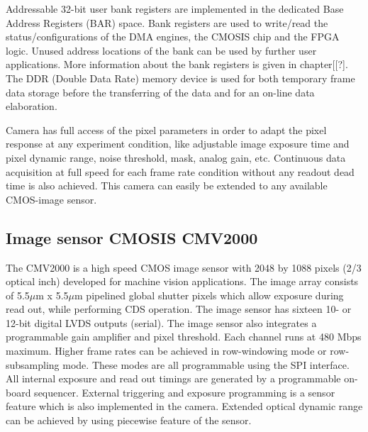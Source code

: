 Addressable 32-bit user bank registers are implemented in the dedicated Base Address Registers (BAR) space. Bank registers are used to write/read the status/configurations of the DMA engines, the CMOSIS chip and the FPGA logic. Unused address locations of the bank can be used by further user applications. More information about the bank registers is given in chapter[[?]. The DDR (Double Data Rate) memory device is used for both temporary frame data storage before the transferring of the data and for an on-line data elaboration.

Camera has full access of the pixel parameters in order to adapt the pixel response at any experiment condition, like adjustable image exposure time and pixel dynamic range, noise threshold, mask, analog gain, etc. Continuous data acquisition at full speed for each frame rate condition without any readout dead time is also achieved. This camera can easily be extended to any available CMOS-image sensor.


\subsection{Image sensor CMOSIS CMV2000}

The CMV2000 is a high speed CMOS image sensor with 2048 by 1088 pixels (2/3 optical inch) developed for machine vision applications. The image array consists of 5.5$\mu$m x 5.5$\mu$m pipelined global shutter pixels which allow exposure during read out, while performing CDS operation. The image sensor has sixteen 10- or 12-bit digital LVDS outputs (serial). The image sensor also integrates a programmable gain amplifier and pixel threshold. Each channel runs at 480 Mbps maximum. Higher frame rates can be achieved in row-windowing mode or row-subsampling mode. These modes are all programmable using the SPI interface. All internal exposure and read out timings are generated by a programmable on-board sequencer. External triggering and exposure programming is a sensor feature which is also implemented in the camera. Extended optical dynamic range can be achieved by using piecewise feature of the sensor.


